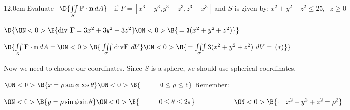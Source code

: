 \begin{frame}
\begin{columns}\begin{column}{12.0cm}
\scriptsize
\EX Evaluate \, $\D{\iint \limits_{S} {\bf F} \cdot {\bf n} \, dA}$	\,\, if $F = [x^3-y^3,y^3-z^3,z^3-x^3]$ and $S$ is given by: $x^2 + y^2 + z^2 \le 25$, \, $z \ge 0$

\vspace{0.1cm}


\vspace{0.2cm}

$\D{
\ON<0>{\B{\text{div } {\bf F} = 3x^2 + 3y^2 + 3z^2}}
\ON<0>{\B{\, = 3(x^2 + y^2 + z^2)}}}$

\vspace{0.2cm}

$\D{\iint \limits_{S} {\bf F} \cdot {\bf n}\, dA = 
\ON<0>{\B{\,\iiint \limits_{T} \text{div} {\bf F} \,\, dV}}
\ON<0>{\B{\,  = \iiint \limits_{T} 3(x^2 + y^2 + z^2) \,\, dV = \, (*)}}
}$

\vspace{0.2cm}

Now we need to choose our coordinates.  Since $S$ is a sphere, we should use spherical coordinates.

\vspace{0.2cm}

$\ON<0>{\B{x = \rho \sin \phi \cos \theta}}
\ON<0>{\B{ \hspace{1.0cm} 0 \le \rho \le 5}} $ \hspace{1.8cm} Remember:
	
\vspace{0.1cm}
	
$\ON<0>{\B{y = \rho \sin \phi \sin \theta}}
\ON<0>{\B{ \hspace{1.0cm} 0 \le \theta \le 2\pi}} \hspace{2.0cm} 
\ON<0>{\B{\cdot \quad x^2+y^2+z^2 = \rho^2}}$	
	
\vspace{0.1cm}
	

\end{column}
\end{columns}
\end{frame}
